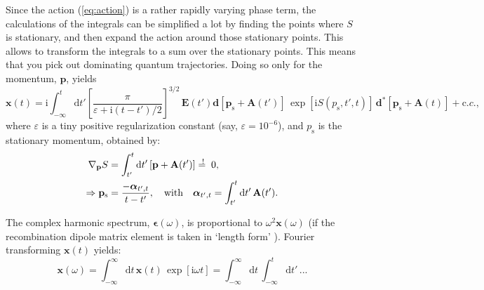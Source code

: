 \documentclass[10pt]{article}
\newcommand{\rmi}{\mathrm i}
\newcommand{\rmd}{\mathrm d}
\newcommand{\ps}{p_{\mathrm s}}
\newcommand{\cc}{\mathrm c.c.}
\begin{document}
Since the action (\ref{eq:action}) is a rather rapidly varying phase term, the calculations of the integrals can be simplified a lot by finding the points where $S$ is stationary, and then expand the action around those stationary points. This allows to transform the integrals to a sum over the stationary points. This means that you pick out dominating quantum trajectories. Doing so only for the momentum, $\mathbf{p}$, yields 
\begin{equation}
	\mathbf{x}(t)	=  \rmi \int_{-\infty}^t \rmd t'  \left[ \frac{\pi}{\varepsilon + \rmi(t-t')/2} \right]^{3/2}  \,\mathbf{E}(t') \mathbf{d}[\mathbf{\ps}+\mathbf{A}(t')] \,\exp[\rmi S(\ps,t',t)] \,\mathbf{d}^* [\mathbf{\ps}+\mathbf{A}(t)] + \cc, 
\end{equation}
where $\varepsilon$ is a tiny positive regularization constant (say, $\varepsilon=10^{-6}$), and $\ps$ is the stationary momentum, obtained by:
\begin{align}
	\nabla_\mathbf{p}  S& = \int_{t'}^{t} \rmd t' \,[\mathbf{p}+\mathbf{A}(t')] =\hspace{-2.3mm}^{!}\hspace{2.3mm} 0,  \\
	\Rightarrow  \mathbf{\ps}& = \frac{-\bm{\alpha}_{t',t}}{t-t'} , \quad \mathrm{with }\quad \bm{\alpha}_{t',t} = \int_{t'}^t \rmd t'\,\mathbf{A}(t') .
\end{align}

The complex harmonic spectrum, $\bm{\epsilon}(\omega)$, is proportional to $\omega^2 \mathbf{x}(\omega)$ (if the recombination dipole matrix element is taken in `length form' \cite{Haessler2011tutorial}). Fourier transforming $ \mathbf{x}(t)$ yields:
\begin{equation}
	 \mathbf{x}(\omega) = \int_{-\infty}^\infty \rmd t\,  \mathbf{x}(t) \,\exp[\rmi\omega t] = \int_{-\infty}^\infty \rmd t\, \int_{-\infty}^t \rmd t' \, ...
\end{equation}
\end{document}
